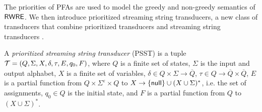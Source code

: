 
The priorities of PFAs are used to model the greedy and non-greedy semantics of ${\sf RWRE}$. %
%
%
We then introduce prioritized streaming string transducers, a new class of transducers that combine prioritized transducers \cite{BM17} %
and streaming string transducers \cite{AC10,AD11}.
  
\begin{definition}
A \emph{prioritized streaming string transducer} (PSST) is a tuple $\mathcal{T} = (Q, \Sigma, X, \delta, \tau, E, q_0, F)$, where $Q$ is a
finite set of states, $\Sigma$ is the input and output alphabet, $X$ is a finite set of variables, $\delta \in Q \times \Sigma \rightarrow \overline{Q}$, $\tau \in Q \rightarrow \overline{Q} \times \overline{Q}$, $E$ is a partial function from $Q \times \Sigma^\varepsilon \times
  Q$ to $X \rightarrow \{\mathsf{null}\} \cup (X \cup \Sigma)^{\ast}$, i.e. the set of assignments,
   $q_0 \in Q$ is the initial state, and $F$ is a partial function
  from $Q$ to $(X \cup \Sigma)^{\ast}$.
\end{definition}

